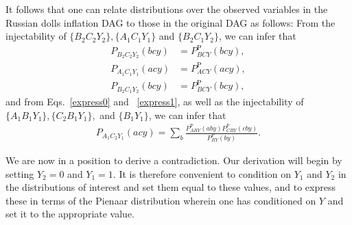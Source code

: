 \documentclass[aps,english,10pt,superscriptaddress,onecolumn,twoside,longbibliography,pra,floatfix,fleqn,nofootinbib]{revtex4-1}%
\theoremstyle{definition}
\begin{document}
It follows that one can relate distributions over the observed variables in the Russian dolls inflation DAG to those in the original DAG as follows:
From the injectability of $\{ B_2 C_2 Y_2\}, \{ A_1 C_1 Y_1\}$ and $\{B_2 C_1 Y_2 \}$, we can infer that 
\begin{align}\label{injsnew}
P_{B_2 C_2 Y_2}(bc y)&= P^{\text{P}}_{BCY}(bc y), \nonumber\\
P_{A_1 C_1  Y_1}(ac y)&= P^{\text{P}}_{ACY}(ac y),\nonumber\\
P_{B_2 C_1 Y_2}(bc y)&= P^{\text{P}}_{BCY}(bc y),
\end{align} 
and from Eqs.~\eqref{express0} and 
~\eqref{express1}, as well as the injectability of $\{A_1 B_1 Y_1\}, \{C_2 B_1 Y_1\},$ and $\{B_1 Y_1\}$, 
we can infer that 
\begin{align}
P_{A_1 C_2 Y_1}(a c y) = \sum_{b} \frac{P^{\text{P}}_{A B Y}(a b y) P^{\text{P}}_{C B Y}(c b y) }{P^{\text{P}}_{B Y}(b y)}.
\label{express1old}
\end{align}

We are now in a position to derive a contradiction.  
Our derivation will begin by setting $Y_2=0$ and $Y_1=1$.  It is therefore convenient to condition on $Y_1$ and $Y_2$ in the distributions of interest and set them equal to these values, and to express these in terms of the Pienaar distribution wherein one has conditioned on $Y$ and set it to the appropriate value. 
\end{document}
